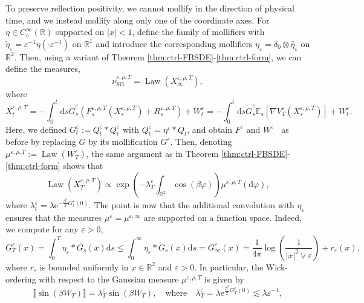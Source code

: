 \documentclass[11pt, a4paper]{scrartcl}
\numberwithin{equation}{section}
\theoremstyle{plain}
\theoremstyle{remark}
\newcommand{\assign}{:=}
\newcommand{\mathd}{\mathrm{d}}
\newcommand{\mathe}{\mathrm{e}}
\newcommand{\tmop}[1]{\ensuremath{\operatorname{#1}}}
\begin{document}
To preserve reflection positivity, we cannot mollify in the direction of physical time, and we instead mollify along only one of the coordinate axes. For $\eta \in C^{\infty}_c (\mathbb{R})$
supported on $| x | < 1$, define the family of mollifiers with
$\tilde{\eta}_{\varepsilon} = \varepsilon^{- 1} \eta (\cdot \varepsilon^{-
		1})$ on $\mathbb{R}^1$ and introduce the corresponding mollifiers
$\eta_{\varepsilon} = \delta_0 \otimes \widetilde{\eta_{\varepsilon}}$ on
$\mathbb{R}^2$. Then, using a variant of Theorem
\ref{thm:ctrl-FBSDE}-\ref{thm:ctrl-form}, we can define the measures,
\[ \nu_{\tmop{SG}}^{\varepsilon, \rho, T} = \tmop{Law} (X^{\varepsilon, \rho,
		T}_{\infty}), \]
where
\begin{equation}
	X^{\varepsilon, \rho, T}_t = - \int_0^t \mathd s \dot{G}^{\varepsilon}_s
	(F^{\varepsilon, \rho, T}_s (X^{\varepsilon, \rho, T}_s) + R^{\varepsilon, \rho, T}_s) +
	W^{\varepsilon}_t = - \int_0^t \mathd s \dot{G}_s^{\varepsilon} \mathbb{E}_s
	[\nabla V_T^{\varepsilon} (X_s^{\varepsilon, \rho, T})] + W_t^{\varepsilon} .
	\label{eq:X-eps-T}
\end{equation}
Here, we defined $G^{\varepsilon}_t \assign Q_t^{\varepsilon} \ast
	Q^{\varepsilon}_t$ with $Q_t^{\varepsilon} = \eta^{\varepsilon} \ast Q_t$, and
obtain $F^{\varepsilon}$ and $W^{\varepsilon}$ \ as before by replacing $G$ by
its mollification $G^{\varepsilon}$. Then, denoting $\mu^{\varepsilon, \rho, T}
	\assign \tmop{Law} (W_T^{\varepsilon})$, the same argument as in Theorem
\ref{thm:ctrl-FBSDE}-\ref{thm:ctrl-form} shows that
\[ \tmop{Law} (X^{\varepsilon, \rho, T}_T) \propto \exp \left( -
	\lambda_T^{\varepsilon} \int_{\mathbb{R}^2} \cos (\beta \varphi) \right)
	\mu^{\varepsilon, \rho, T} (\mathd \varphi), \]
where $\lambda^{\varepsilon}_t = \lambda \mathe^{- \frac{\beta^2}{2}
		G_t^{\varepsilon} (0)}$. The point is now that the additional convolution with
$\eta_{\varepsilon}$ ensures that the measures $\mu^{\varepsilon} =
	\mu^{\varepsilon, \infty}$ are supported on a function space. Indeed, we
compute for any $\varepsilon > 0$,
\[ G^{\varepsilon}_T (x) = \int_0^T \eta_{\varepsilon} \ast \dot{G_s} (x)
	\mathd s \leqslant \int_0^{\infty} \eta_{\varepsilon} \ast \dot{G}_s (x)
	\mathd s = G^{\varepsilon}_{\infty} (x) = \frac{1}{4 \pi} \log \left(
	\frac{1}{| x |^2 \vee \varepsilon} \right) + r_{\varepsilon} (x), \]
where $r_{\varepsilon}$ is bounded uniformly in $x \in \mathbb{R}^2$ and
$\varepsilon > 0$. In particular, the Wick-ordering with respect to the
Gaussian measure $\mu^{\varepsilon, \rho, T}$ is given by
\[ \llbracket \sin (\beta W_T) \rrbracket = \lambda_T^{\varepsilon} \sin
	(\beta W_T), \quad \text{where} \quad \lambda^{\varepsilon}_T = \lambda
	\mathe^{\frac{\beta^2}{2} G_T^{\varepsilon} (0)} \lesssim \lambda
	\varepsilon^{- 1}, \]
\end{document}

